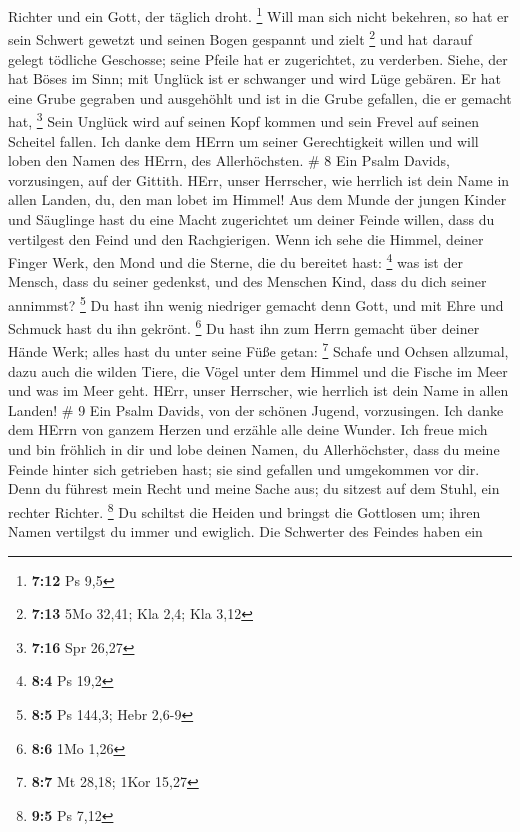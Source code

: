 Richter und ein Gott, der täglich droht. \footnote{\textbf{7:12} Ps 9,5}
 Will man sich nicht bekehren, so hat er sein Schwert
gewetzt und seinen Bogen gespannt und zielt \footnote{\textbf{7:13} 5Mo
  32,41; Kla 2,4; Kla 3,12}  und hat darauf gelegt tödliche
Geschosse; seine Pfeile hat er zugerichtet, zu verderben. 
Siehe, der hat Böses im Sinn; mit Unglück ist er schwanger und wird Lüge
gebären.  Er hat eine Grube gegraben und ausgehöhlt und ist
in die Grube gefallen, die er gemacht hat, \footnote{\textbf{7:16} Spr
  26,27}  Sein Unglück wird auf seinen Kopf kommen und sein
Frevel auf seinen Scheitel fallen.  Ich danke dem HErrn um
seiner Gerechtigkeit willen und will loben den Namen des HErrn, des
Allerhöchsten. \# 8  Ein Psalm Davids, vorzusingen, auf der
Gittith.  HErr, unser Herrscher, wie herrlich ist dein Name
in allen Landen, du, den man lobet im Himmel!  Aus dem Munde
der jungen Kinder und Säuglinge hast du eine Macht zugerichtet um deiner
Feinde willen, dass du vertilgest den Feind und den Rachgierigen.
 Wenn ich sehe die Himmel, deiner Finger Werk, den Mond und
die Sterne, die du bereitet hast: \footnote{\textbf{8:4} Ps 19,2}
 was ist der Mensch, dass du seiner gedenkst, und des
Menschen Kind, dass du dich seiner annimmst? \footnote{\textbf{8:5} Ps
  144,3; Hebr 2,6-9}  Du hast ihn wenig niedriger gemacht
denn Gott, und mit Ehre und Schmuck hast du ihn gekrönt. \footnote{\textbf{8:6}
  1Mo 1,26}  Du hast ihn zum Herrn gemacht über deiner Hände
Werk; alles hast du unter seine Füße getan: \footnote{\textbf{8:7} Mt
  28,18; 1Kor 15,27}  Schafe und Ochsen allzumal, dazu auch
die wilden Tiere,  die Vögel unter dem Himmel und die Fische
im Meer und was im Meer geht.  HErr, unser Herrscher, wie
herrlich ist dein Name in allen Landen! \# 9  Ein Psalm
Davids, von der schönen Jugend, vorzusingen.  Ich danke dem
HErrn von ganzem Herzen und erzähle alle deine Wunder.  Ich
freue mich und bin fröhlich in dir und lobe deinen Namen, du
Allerhöchster,  dass du meine Feinde hinter sich getrieben
hast; sie sind gefallen und umgekommen vor dir.  Denn du
führest mein Recht und meine Sache aus; du sitzest auf dem Stuhl, ein
rechter Richter. \footnote{\textbf{9:5} Ps 7,12}  Du
schiltst die Heiden und bringst die Gottlosen um; ihren Namen vertilgst
du immer und ewiglich.  Die Schwerter des Feindes haben ein
